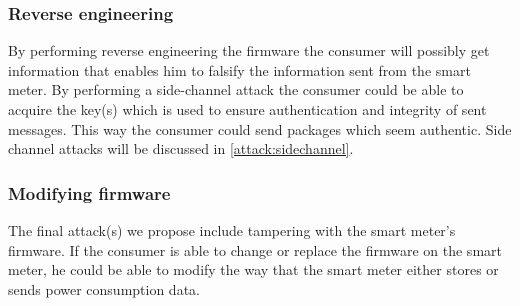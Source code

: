 \subsubsection{Reverse engineering}
By performing reverse engineering the firmware the consumer will possibly get information that enables him to falsify the information sent from the smart meter.
By performing a side-channel attack the consumer could be able to acquire the key(s) which is used to ensure authentication and integrity of sent messages.
This way the consumer could send packages which seem authentic.
Side channel attacks will be discussed in \cref{attack:sidechannel}.

\subsubsection{Modifying firmware}
The final attack(s) we propose include tampering with the smart meter's firmware.
If the consumer is able to change or replace the firmware on the smart meter, he could be able to modify the way that the smart meter either stores or sends power consumption data.
